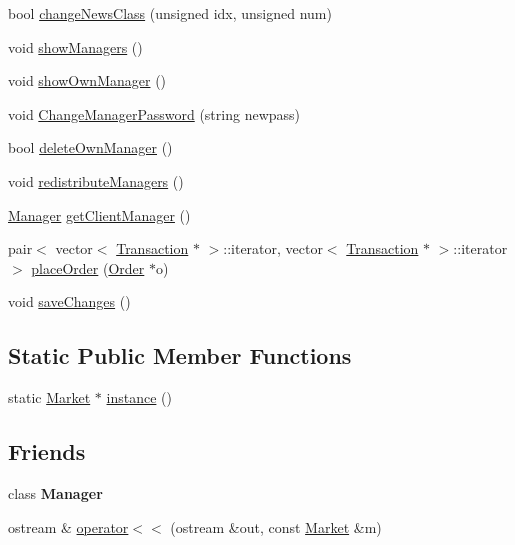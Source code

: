 \begin{DoxyCompactItemize}
bool \hyperlink{class_market_aed66e17ba743e8aca8674c1005ca957f}{change\+News\+Class} (unsigned idx, unsigned num)
\item 
void \hyperlink{class_market_a5576cae65a6b9c2cea668246e1683b2e}{show\+Managers} ()
\item 
void \hyperlink{class_market_adc76de7d85e9b35b082b0c710de5ce0b}{show\+Own\+Manager} ()
\item 
void \hyperlink{class_market_adec18f71a55512b0ea152c06e95662f9}{Change\+Manager\+Password} (string newpass)
\item 
bool \hyperlink{class_market_ab2b282d3a7f73a5e71b54a5367e85d12}{delete\+Own\+Manager} ()
\item 
void \hyperlink{class_market_af1966f2ec86347b1fbfc085d8e5c2781}{redistribute\+Managers} ()
\item 
\hyperlink{class_manager}{Manager} \hyperlink{class_market_a9a1890b1cbe63050690562427a3c7a0d}{get\+Client\+Manager} ()
\item 
pair$<$ vector$<$ \hyperlink{class_transaction}{Transaction} $\ast$ $>$\+::iterator, vector$<$ \hyperlink{class_transaction}{Transaction} $\ast$ $>$\+::iterator $>$ \hyperlink{class_market_adbc97b770d67a3af3258737a00112dc0}{place\+Order} (\hyperlink{class_order}{Order} $\ast$o)
\item 
void \hyperlink{class_market_abbd4b3c218551e7fcce39cd7916aa35e}{save\+Changes} ()
\end{DoxyCompactItemize}
\subsection*{Static Public Member Functions}
\begin{DoxyCompactItemize}
\item 
static \hyperlink{class_market}{Market} $\ast$ \hyperlink{class_market_ab55699aa5df4c8c7a6085cdd3ddc9b38}{instance} ()
\end{DoxyCompactItemize}
\subsection*{Friends}
\begin{DoxyCompactItemize}
\item 
\hypertarget{class_market_adddd5c43ff870a047aa66db4edf82a7e}{}\label{class_market_adddd5c43ff870a047aa66db4edf82a7e} 
class {\bfseries Manager}
\item 
ostream \& \hyperlink{class_market_a7011d607c3f984135fbc081b8909a1d6}{operator$<$$<$} (ostream \&out, const \hyperlink{class_market}{Market} \&m)
\end{DoxyCompactItemize}


